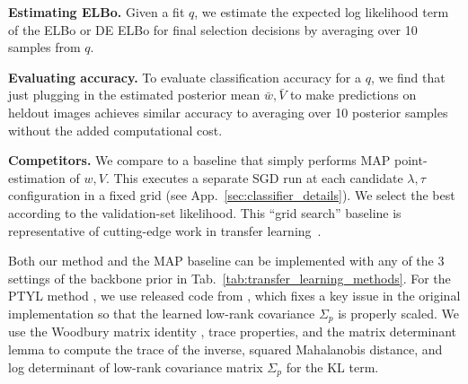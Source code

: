 \textbf{Estimating ELBo.}
Given a fit $q$, we estimate the expected log likelihood term of the ELBo or DE ELBo for final selection decisions by averaging over 10 samples from $q$. 

\textbf{Evaluating accuracy.}
To evaluate classification accuracy for a $q$, we find that just plugging in the estimated posterior mean $\bar{w}, \bar{V}$ to make predictions on heldout images achieves similar accuracy to averaging over 10 posterior samples without the added computational cost.

\textbf{Competitors.}
We compare to a baseline that simply performs MAP point-estimation of $w,V$. This executes a separate SGD run at each candidate $\lambda, \tau$ configuration in a fixed grid (see App.~\ref{sec:classifier_details}).
We select the best according to the validation-set likelihood.
This ``grid search'' baseline is representative of cutting-edge work in transfer learning~\citep{shwartz2022pre,harvey2024transfer}.

Both our method and the MAP baseline can be implemented with any of the 3 settings of the backbone prior in Tab.~\ref{tab:transfer_learning_methods}. For the PTYL method \citep{shwartz2022pre}, we use released code from \citet{harvey2024transfer}, which fixes a key issue in the original implementation so that the learned low-rank covariance $\Sigma_p$ is properly scaled.
We use the Woodbury matrix identity \citep{woodbury1950inverting}, trace properties, and the matrix determinant lemma to compute the trace of the inverse, squared Mahalanobis distance, and log determinant of low-rank covariance matrix $\Sigma_p$ for the KL term. %
